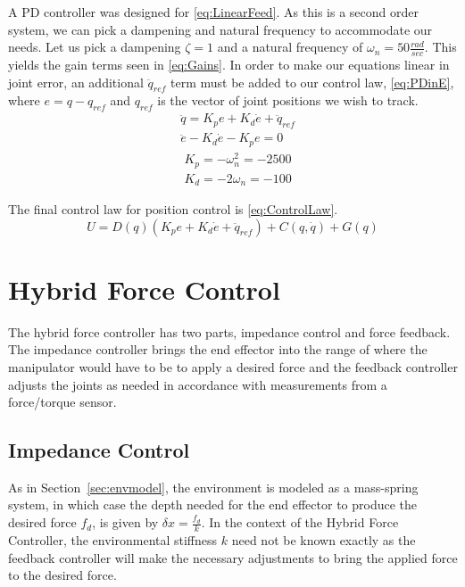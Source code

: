 \documentclass[letterpaper,12pt]{report}
\begin{document}
A PD controller was designed for \eqref{eq:LinearFeed}. As this is a second order system, we can pick a dampening and natural frequency
to accommodate our needs. Let us pick a dampening $\zeta=1$ and a natural frequency of $\omega_n = 50 \frac{rad}{sec}$. This yields the
gain terms seen in \eqref{eq:Gains}. In order to make our equations linear in joint error, an additional $\ddot q_{ref}$ term must be added
to our control law, \eqref{eq:PDinE}, where $e = q - q_{ref}$ and $q_{ref}$ is the vector of joint positions we wish to track.
\begin{subequations} \label{eq:PDinE}
\begin{align}
	&\ddot q = K_pe + K_d\dot e + \ddot q_{ref}\\
	&\ddot e - K_d\dot e - K_p e = 0
\end{align}
\end{subequations}
\begin{subequations} \label{eq:Gains}
\begin{align}
	&K_p = -\omega_n^2 = -2500\\
	&K_d = -2\omega_n = -100
\end{align}
\end{subequations}

The final control law for position control is \eqref{eq:ControlLaw}.
\begin{equation} \label{eq:ControlLaw}
U = D(q)(K_pe + K_d\dot e + \ddot q_{ref}) + C(q,\dot q) + G(q)
\end{equation}

\section{Hybrid Force Control}

The hybrid force controller has two parts, impedance control and force feedback. The impedance controller brings the end effector
into the range of where the manipulator would have to be to apply a desired force and the feedback controller adjusts the joints as
needed in accordance with measurements from a force/torque sensor.

\subsection{Impedance Control}
As in Section~\ref{sec:envmodel}, the environment is modeled as a mass-spring system, in which case the depth needed for the end effector
to produce the desired force $f_d$, is given by $\delta x = \frac {f_d}k$. In the context of the Hybrid Force Controller, the environmental
stiffness $k$ need not be known exactly as the feedback controller will make the necessary adjustments to bring the applied force to the 
desired force. 
\end{document}
